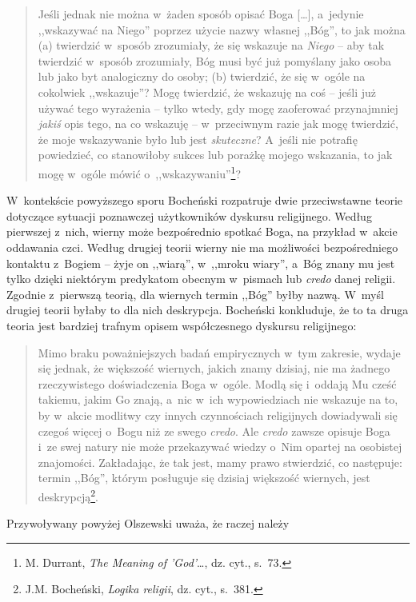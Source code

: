 \begin{quote}
Jeśli jednak nie można w~żaden sposób opisać Boga [\ldots], a~jedynie ,,wskazywać na Niego'' poprzez użycie nazwy własnej ,,Bóg'', to jak można (a) twierdzić w~sposób zrozumiały, że się wskazuje na \textit{Niego} -- aby tak twierdzić w~sposób zrozumiały, Bóg musi być już pomyślany jako osoba lub jako byt analogiczny do osoby; (b) twierdzić, że się w~ogóle na cokolwiek ,,wskazuje''? Mogę twierdzić, że wskazuję na coś -- jeśli już używać tego wyrażenia -- tylko wtedy, gdy mogę zaoferować przynajmniej \textit{jakiś} opis tego, na co wskazuję -- w~przeciwnym razie jak mogę twierdzić, że moje wskazywanie było lub jest \textit{skuteczne}? A~jeśli nie potrafię powiedzieć, co stanowiłoby sukces lub porażkę mojego wskazania, to jak mogę w~ogóle mówić o~,,wskazywaniu''\footnote{M. Durrant, \textit{The Meaning of 'God'}\ldots, dz. cyt., s.~73.}?
\end{quote}

W~kontekście powyższego sporu Bocheński rozpatruje dwie przeciwstawne teorie dotyczące sytuacji poznawczej użytkowników dyskursu religijnego. Według pierwszej z~nich, wierny może bezpośrednio spotkać Boga, na przykład w~akcie oddawania czci. Według drugiej teorii wierny nie ma możliwości bezpośredniego kontaktu z~Bogiem -- żyje on ,,wiarą'', w~,,mroku wiary'', a~Bóg znany mu jest tylko dzięki niektórym predykatom obecnym w~pismach lub \textit{credo} danej religii. Zgodnie z~pierwszą teorią, dla wiernych termin ,,Bóg'' byłby nazwą. W~myśl drugiej teorii byłaby to dla nich deskrypcja. Bocheński konkluduje, że to ta druga teoria jest bardziej trafnym opisem współczesnego dyskursu religijnego:

\begin{quote}
Mimo braku poważniejszych badań empirycznych w~tym zakresie, wydaje się jednak, że większość wiernych, jakich znamy dzisiaj, nie ma żadnego rzeczywistego doświadczenia Boga w~ogóle. Modlą się i~oddają Mu cześć takiemu, jakim Go znają, a~nic w~ich wypowiedziach nie wskazuje na to, by w~akcie modlitwy czy innych czynnościach religijnych dowiadywali się czegoś więcej o~Bogu niż ze swego \textit{credo}. Ale \textit{credo} zawsze opisuje Boga i~ze swej natury nie może przekazywać wiedzy o~Nim opartej na osobistej znajomości. Zakładając, że tak jest, mamy prawo stwierdzić, co następuje: termin ,,Bóg'', którym posługuje się dzisiaj większość wiernych, jest deskrypcją\footnote{J.M. Bocheński, \textit{Logika religii}, dz. cyt., s.~381.}.
\end{quote}
Przywoływany powyżej Olszewski uważa, że raczej należy

